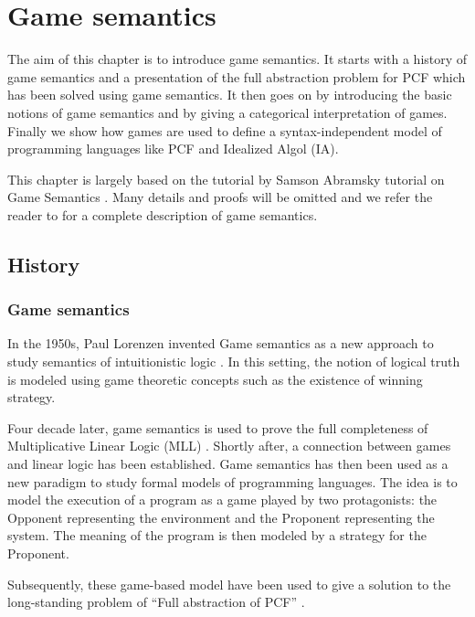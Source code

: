 \chapter{Game semantics}

The aim of this chapter is to introduce game semantics. It starts
with a history of game semantics and a presentation of the full
abstraction problem for PCF which has been solved using game
semantics. It then goes on by introducing the basic notions of game
semantics and by giving a categorical interpretation of games.
Finally we show how games are used to define a syntax-independent
model of programming languages like PCF and Idealized Algol (IA).

This chapter is largely based on the tutorial by Samson Abramsky
tutorial on Game Semantics \cite{AM98a}. Many details and proofs
will be omitted and we refer the reader to \cite{hylandong_pcf,
abramsky94full} for a complete description of game semantics.

\section{History}

\subsection{Game semantics}

In the 1950s, Paul Lorenzen invented Game semantics as a new
approach to study semantics of intuitionistic logic \citep{lor61}.
In this setting, the notion of logical truth is modeled using game
theoretic concepts such as the existence of winning strategy.

Four decade later, game semantics is used to prove the full
completeness of Multiplicative Linear Logic (MLL)
\citep{abramsky92games,HO93a}. Shortly after, a connection between
games and linear logic has been established. Game semantics has then
been used as a new paradigm to study formal models of programming
languages. The idea is to model the execution of a program as a game
played by two protagonists: the Opponent representing the
environment and the Proponent representing the system. The meaning
of the program is then modeled by a strategy for the Proponent.


Subsequently, these game-based model have been used to give a
solution to the long-standing problem of ``Full abstraction of PCF''
\citep{abramsky94full, hylandong_pcf,Nickau:lfcs94}.

